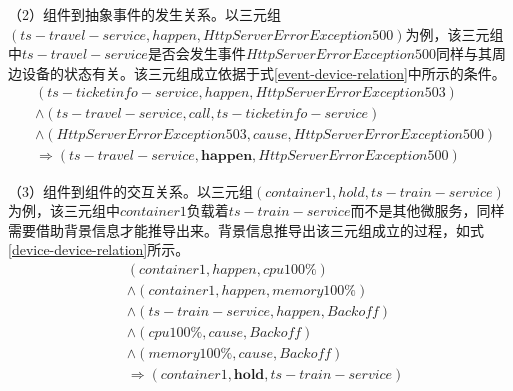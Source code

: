 （2）组件到抽象事件的发生关系。以三元组$(ts-travel-service, happen, HttpServerError Exception 500)$为例，该三元组中$ts-travel-service$是否会发生事件$HttpServerError$$Exception 500$同样与其周边设备的状态有关。该三元组成立依据于式\ref{event-device-relation}中所示的条件。
\begin{equation}
    \begin{aligned}
        &\left ( ts-ticketinfo-service, happen,  HttpServerError Exception 503\right ) \\
        &\wedge \left ( ts-travel-service, call, ts-ticketinfo-service \right ) \\
        &\wedge \left ( HttpServerError Exception 503, cause, HttpServerError Exception 500 \right ) \\
        &\Rightarrow \left ( ts-travel-service, \boldsymbol{happen}, HttpServerError Exception 500 \right )
    \end{aligned}
\label{event-device-relation}
\end{equation}

（3）组件到组件的交互关系。以三元组$\left( container1, hold, ts-train-service \right)$为例，该三元组中$container1$负载着$ts-train-service$而不是其他微服务，同样需要借助背景信息才能推导出来。背景信息推导出该三元组成立的过程，如式\ref{device-device-relation}所示。
\begin{equation}
    \begin{aligned}
        &\left ( container1, happen,  cpu 100\% \right ) \\
        &\wedge \left ( container1, happen,  memory 100\% \right) \\
        &\wedge \left ( ts-train-service, happen,  Backoff \right) \\
        &\wedge \left ( cpu 100\%, cause,  Backoff \right) \\
        &\wedge \left ( memory 100\%, cause,  Backoff \right) \\
        &\Rightarrow \left ( container1, \boldsymbol{hold}, ts-train-service \right )
    \end{aligned}
\label{device-device-relation}
\end{equation}

